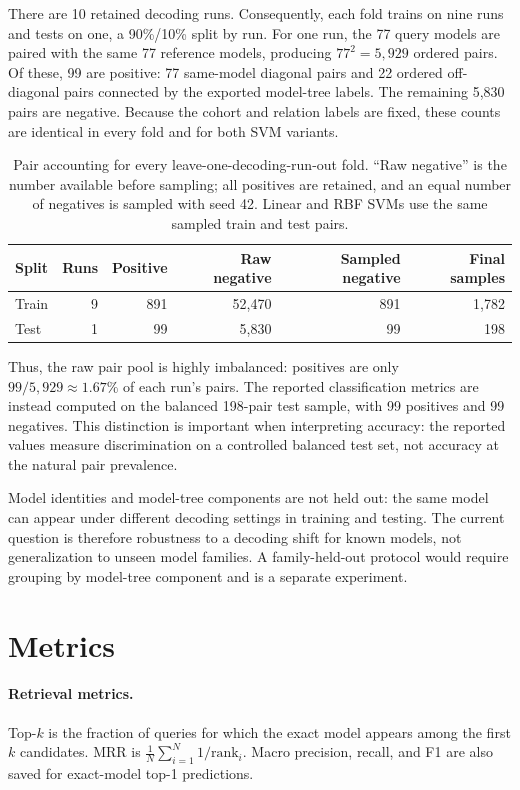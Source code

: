 \documentclass[11pt,a4paper]{article}
\begin{document}
There are 10 retained decoding runs. Consequently, each fold trains on nine
runs and tests on one, a 90\%/10\% split by run. For one run, the 77 query models
are paired with the same 77 reference models, producing $77^2=5{,}929$ ordered
pairs. Of these, 99 are positive: 77 same-model diagonal pairs and 22 ordered
off-diagonal pairs connected by the exported model-tree labels. The remaining
5,830 pairs are negative. Because the cohort and relation labels are fixed,
these counts are identical in every fold and for both SVM variants.

\begin{table}[ht]
\centering
\caption{Pair accounting for every leave-one-decoding-run-out fold. ``Raw
negative'' is the number available before sampling; all positives are retained,
and an equal number of negatives is sampled with seed 42. Linear and RBF SVMs
use the same sampled train and test pairs.}
\label{tab:pair-counts}
\begin{tabular}{lrrrrr}
\toprule
Split & Runs & Positive & Raw negative & Sampled negative & Final samples \\
\midrule
Train & 9 & 891 & 52,470 & 891 & 1,782 \\
Test  & 1 & 99  & 5,830  & 99  & 198 \\
\bottomrule
\end{tabular}
\end{table}

Thus, the raw pair pool is highly imbalanced: positives are only
$99/5{,}929\approx1.67\%$ of each run's pairs. The reported classification
metrics are instead computed on the balanced 198-pair test sample, with 99
positives and 99 negatives. This distinction is important when interpreting
accuracy: the reported values measure discrimination on a controlled balanced
test set, not accuracy at the natural pair prevalence.

Model identities and model-tree components are not held out: the same model can
appear under different decoding settings in training and testing.  The current
question is therefore robustness to a decoding shift for known models, not
generalization to unseen model families.  A family-held-out protocol would
require grouping by model-tree component and is a separate experiment.

\section{Metrics}

\paragraph{Retrieval metrics.}
Top-$k$ is the fraction of queries for which the exact model appears among the
first $k$ candidates.  MRR is
$\frac{1}{N}\sum_{i=1}^{N}1/\mathrm{rank}_i$.  Macro precision, recall, and F1
are also saved for exact-model top-1 predictions.
\end{document}
